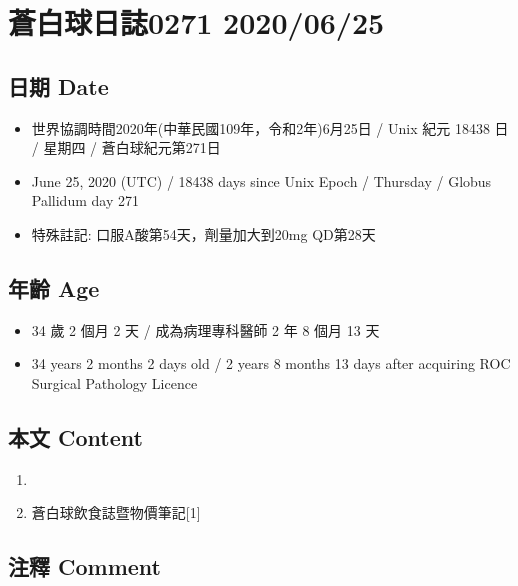 \documentclass[a5paper, 11pt
]{book}
\providecommand{\tightlist}{%
  \setlength{\itemsep}{0pt}\setlength{\parskip}{0pt}}
\begin{document}
\hypertarget{ux84bcux767dux7403ux65e5ux8a8c0271-20200625}{%
\section{蒼白球日誌0271
2020/06/25}\label{ux84bcux767dux7403ux65e5ux8a8c0271-20200625}}

\hypertarget{ux65e5ux671f-date-24}{%
\subsection{日期 Date}\label{ux65e5ux671f-date-24}}

\begin{itemize}
\tightlist
\item
  世界協調時間2020年(中華民國109年，令和2年)6月25日 / Unix 紀元 18438 日
  / 星期四 / 蒼白球紀元第271日
\item
  June 25, 2020 (UTC) / 18438 days since Unix Epoch / Thursday / Globus
  Pallidum day 271
\item
  特殊註記: 口服A酸第54天，劑量加大到20mg QD第28天
\end{itemize}

\hypertarget{ux5e74ux9f61-age-24}{%
\subsection{年齡 Age}\label{ux5e74ux9f61-age-24}}

\begin{itemize}
\tightlist
\item
  34 歲 2 個月 2 天 / 成為病理專科醫師 2 年 8 個月 13 天
\item
  34 years 2 months 2 days old / 2 years 8 months 13 days after
  acquiring ROC Surgical Pathology Licence
\end{itemize}

\hypertarget{ux672cux6587-content-24}{%
\subsection{本文 Content}\label{ux672cux6587-content-24}}

\begin{enumerate}
\def\labelenumi{\arabic{enumi}.}
\tightlist
\item
\item
  蒼白球飲食誌暨物價筆記{[}1{]}
\end{enumerate}

\hypertarget{ux6ce8ux91cb-comment-24}{%
\subsection{注釋 Comment}\label{ux6ce8ux91cb-comment-24}}
\end{document}
